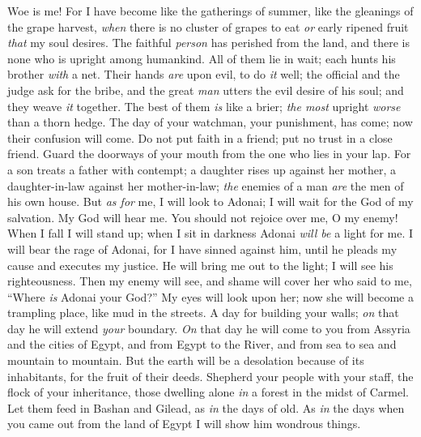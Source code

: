 \begin{biblechapter} %
 Woe is me! For I have become 
like the gatherings of summer, 
like the gleanings of the grape harvest, 
\textit{when} there is no cluster of grapes to eat 
\textit{or} early ripened fruit \textit{that} my soul desires.
\verse The faithful \textit{person} has perished from the land, 
and there is none who is upright among humankind. 
All of them lie in wait; 
each hunts his brother \textit{with} a net.
\verse Their hands \textit{are} upon evil, to do \textit{it} well; 
the official and the judge ask for the bribe, 
and the great \textit{man} utters the evil desire of his soul; 
and they weave \textit{it} together.
\verse The best of them \textit{is} like a brier; 
\textit{the most} upright \textit{worse} than a thorn hedge. 
The day of your watchman, your punishment, has come; 
now their confusion will come.
\verse Do not put faith in a friend; 
put no trust in a close friend. 
Guard the doorways of your mouth 
from the one who lies in your lap.
\verse For a son treats a father with contempt; 
a daughter rises up against her mother, 
a daughter-in-law against her mother-in-law; 
\textit{the} enemies of a man \textit{are} the men of his own house.
\verse But \textit{as for} me, I will look to Adonai; 
I will wait for the God of my salvation. 
My God will hear me.
\verse You should not rejoice over me, O my enemy! 
When I fall I will stand up; 
when I sit in darkness 
Adonai \textit{will be} a light for me.
\verse I will bear the rage of Adonai, 
for I have sinned against him, 
until he pleads my cause 
and executes my justice. 
He will bring me out to the light; 
I will see his righteousness.
\verse Then my enemy will see, 
and shame will cover her who said to me, 
“Where \textit{is} Adonai your God?” 
My eyes will look upon her; 
now she will become a trampling place, 
like mud in the streets.
\verse A day for building your walls; 
\textit{on} that day he will extend \textit{your} boundary.
\verse \textit{On} that day he will come to you 
from Assyria and the cities of Egypt, 
and from Egypt to the River, 
and from sea to sea 
and mountain to mountain.
\verse But the earth will be a desolation 
because of its inhabitants, 
for the fruit of their deeds.
\verse Shepherd your people with your staff, 
the flock of your inheritance, 
those dwelling alone \textit{in} a forest 
in the midst of Carmel. 
Let them feed in Bashan and Gilead, 
as \textit{in} the days of old.
\verse As \textit{in} the days when you came out 
from the land of Egypt 
I will show him wondrous things.

\end{biblechapter}
